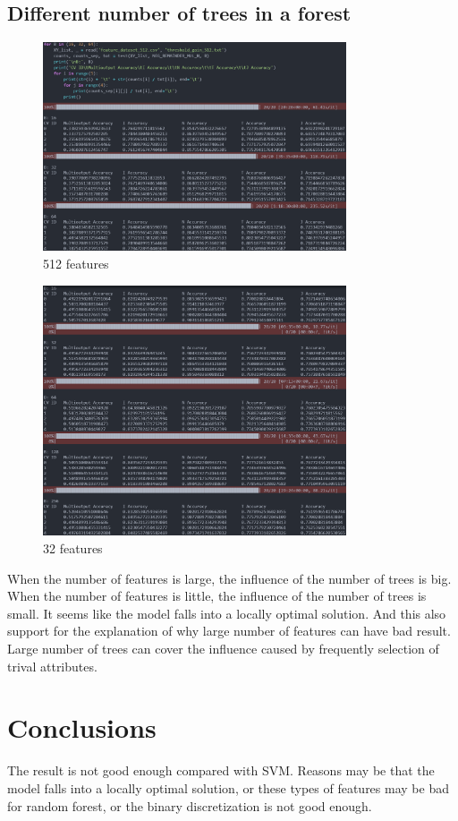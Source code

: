 \documentclass[UTF8, a4paper, 11pt]{article}
\begin{document}
\subsection{Different number of trees in a forest}
\begin{figure}[H]
    \centering
    \includegraphics[width=0.8\textwidth]{512_gain.png}
    \caption{512 features}
\end{figure}
\begin{figure}[H]
    \centering
    \includegraphics[width=0.8\textwidth]{32_gini.png}
    \caption{32 features}
\end{figure}
When the number of features is large, the influence of the number of trees is big.
When the number of features is little, the influence of the number of trees is small.
It seems like the model falls into a locally optimal solution.
And this also support for the explanation of why large number of features can have bad result.
Large number of trees can cover the influence caused by frequently selection of trival attributes.
\section{Conclusions}
The result is not good enough compared with SVM.
Reasons may be that the model falls into a locally optimal solution, or these types of features may be bad for random forest, or the binary discretization is not good enough.
%
%
\end{document}
